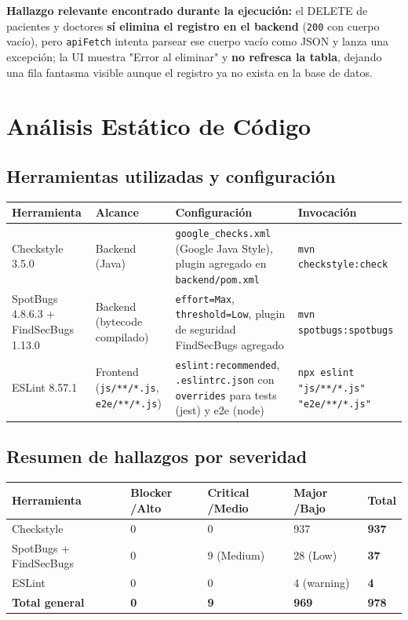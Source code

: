 \documentclass[11pt,a4paper]{article}
\begin{document}
\textbf{Hallazgo relevante encontrado durante la ejecuci\'on:} el DELETE de
pacientes y doctores \textbf{s\'i elimina el registro en el backend}
(\texttt{200} con cuerpo vac\'io), pero \texttt{apiFetch} intenta parsear ese
cuerpo vac\'io como JSON y lanza una excepci\'on; la UI muestra "Error al
eliminar" y \textbf{no refresca la tabla}, dejando una fila fantasma visible
aunque el registro ya no exista en la base de datos.

\newpage
\section{An\'alisis Est\'atico de C\'odigo}

\subsection{Herramientas utilizadas y configuraci\'on}

\begin{longtable}{@{}p{2.6cm}p{3cm}p{5.5cm}p{2.5cm}@{}}
\toprule
\textbf{Herramienta} & \textbf{Alcance} & \textbf{Configuraci\'on} & \textbf{Invocaci\'on} \\
\midrule
\endhead
Checkstyle 3.5.0 & Backend (Java) & \texttt{google\_checks.xml} (Google Java
  Style), plugin agregado en \texttt{backend/pom.xml} &
  \texttt{mvn checkstyle:check} \\
SpotBugs 4.8.6.3 + FindSecBugs 1.13.0 & Backend (bytecode compilado) &
  \texttt{effort=Max}, \texttt{threshold=Low}, plugin de seguridad
  FindSecBugs agregado &
  \texttt{mvn spotbugs:spotbugs} \\
ESLint 8.57.1 & Frontend (\texttt{js/**/*.js}, \texttt{e2e/**/*.js}) &
  \texttt{eslint:recommended}, \texttt{.eslintrc.json} con
  \texttt{overrides} para tests (jest) y e2e (node) &
  \texttt{npx eslint "js/**/*.js" "e2e/**/*.js"} \\
\bottomrule
\end{longtable}

\subsection{Resumen de hallazgos por severidad}

\begin{longtable}{@{}p{4.2cm}p{2.6cm}p{2.6cm}p{2.6cm}p{1.8cm}@{}}
\toprule
\textbf{Herramienta} & \textbf{Blocker /\newline Alto} & \textbf{Critical /\newline Medio} & \textbf{Major /\newline Bajo} & \textbf{Total} \\
\midrule
\endhead
Checkstyle & 0 & 0 & 937 & \textbf{937} \\
SpotBugs + FindSecBugs & 0 & 9 (Medium) & 28 (Low) & \textbf{37} \\
ESLint & 0 & 0 & 4 (warning) & \textbf{4} \\
\midrule
\textbf{Total general} & \textbf{0} & \textbf{9} & \textbf{969} & \textbf{978} \\
\bottomrule
\end{longtable}
\end{document}
